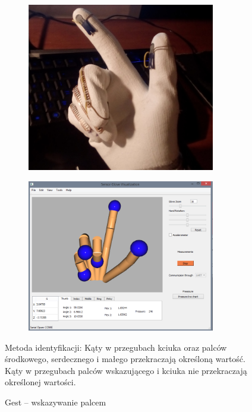 \documentclass[12pt,a4paper]{article}
\begin{document}
\begin{figure}[!htb]
\centering
    \begin{subfigure}{.5\textwidth}
      \includegraphics[width=0.9\textwidth]{./images/Point.jpg}
     \end{subfigure}%
    \begin{subfigure}{.5\textwidth}
      \includegraphics[width=0.9\textwidth]{./images/PointQt.png}
     \end{subfigure}
    \caption{Gest -- wskazywanie palcem \label{fig:Point}}
\flushleft Metoda identyfikacji: Kąty w przegubach kciuka oraz palców środkowego, serdecznego i małego przekraczają określoną wartość. Kąty w przegubach palców wskazującego i kciuka nie przekraczają określonej wartości.
\end{figure}
\end{document}
